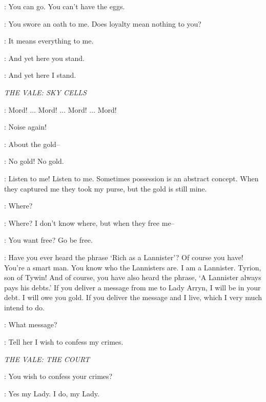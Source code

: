 \JORAH: You can go. You can't have the eggs. 

\VISERYS: You swore an oath to me. Does loyalty mean nothing to you? 

\JORAH: It means everything to me. 

\VISERYS: And yet here you stand. 

\JORAH: And yet here I stand. 



\scene

\textit{THE VALE: SKY CELLS} 


\TYRION: Mord! $\ldots$ Mord! $\ldots$ Mord! $\ldots$ Mord! 


\MORD: Noise again! 

\TYRION: About the gold-- 

\MORD: No gold! No gold. 

\TYRION: Listen to me! Listen to me. Sometimes possession is an abstract concept. When they captured me they took my purse, but the gold is still mine. 

\MORD: Where? 

\TYRION: Where? I don't know where, but when they free me--

\MORD: You want free?  Go be free. 

\TYRION: Have you ever heard the phrase `Rich as a Lannister'? Of course you have! You're a smart man. You know who the Lannisters are. I am a Lannister. Tyrion, son of Tywin! And of course, you have also heard the phrase, `A Lannister always pays his debts.' If you deliver a message from me to Lady Arryn, I will be in your debt. I will owe you gold. If you deliver the message and I live, which I very much intend to do. 

\MORD: What message? 

\TYRION: Tell her I wish to confess my crimes. 


\scene

\textit{THE VALE: THE COURT} 


\LYSA: You wish to confess your crimes? 

\TYRION: Yes my Lady. I do, my Lady. 

